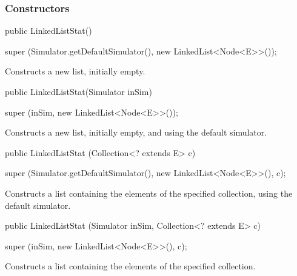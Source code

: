 \subsubsection* {Constructors}
\begin{code}

   public LinkedListStat()\begin{hide} {
      super (Simulator.getDefaultSimulator(), new LinkedList<Node<E>>());
   } \end{hide}
\end{code}
\begin{tabb} Constructs a new list, initially empty.
\end{tabb}
\begin{code}

   public LinkedListStat(Simulator inSim)\begin{hide} {
      super (inSim, new LinkedList<Node<E>>());
   } \end{hide}
\end{code}
\begin{tabb} Constructs a new list, initially empty, and using the default simulator.
\end{tabb}
\begin{htmlonly}
\end{htmlonly}
\begin{code}

   public LinkedListStat (Collection<? extends E> c)\begin{hide} {
      super (Simulator.getDefaultSimulator(), new LinkedList<Node<E>>(), c);
   }\end{hide}
\end{code}
\begin{tabb} Constructs a list containing the elements of the specified
   collection, using the default simulator.
\end{tabb}
\begin{htmlonly}
\end{htmlonly}
\begin{code}

   public LinkedListStat (Simulator inSim, Collection<? extends E> c)\begin{hide} {
      super (inSim, new LinkedList<Node<E>>(), c);
   }\end{hide}
\end{code}
\begin{tabb} Constructs a list containing the elements of the specified
   collection.
\end{tabb}
